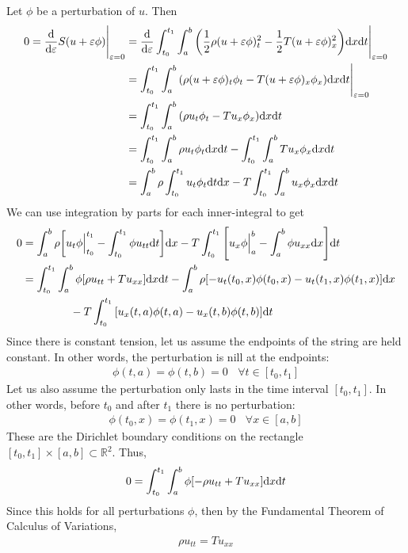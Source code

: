 \documentclass[12pt]{article}
\theoremstyle{plain}
\newcommand{\E}{\varepsilon}
\begin{document}
Let $\phi$ be a perturbation of $u$.  Then
\begin{align*}
    0 = \frac{\dd}{\dd \E}S(u + \E\phi)\Bigg|_{\E = 0} &= \frac{\dd}{\dd \E}\int_{t_0}^{t_1}\int_a^b \qty(\frac{1}{2}\rho (u + \E\phi)_t^2 - \frac{1}{2}T (u + \E\phi)_x^2)\dd x \dd t \Bigg|_{\E = 0} \\
    &= \int_{t_0}^{t_1} \int_a^b \qty(\rho(u + \E \phi)_t\phi_t - T(u + \E \phi)_x \phi_x) \dd x \dd t\Bigg|_{\E = 0} \\
    &= \int_{t_0}^{t_1}\int_a^b \qty(\rho u_t \phi_t - T u_x \phi_x) \dd x \dd t \\
    &= \int_{t_0}^{t_1}\int_a^b \rho u_t \phi_t \dd x \dd t - \int_{t_0}^{t_1} \int_a^b T u_x \phi_x \dd x \dd t \\
    &= \int_a^b \rho \int_{t_0}^{t_1} u_t \phi_t \dd t \dd x - T \int_{t_0}^{t_1}\int_a^b u_x \phi_x \dd x \dd t
\end{align*}
We can use integration by parts for each inner-integral to get
\begin{align*}
    0 &= \int_a^b \rho \qty[u_t\phi\Big|_{t_0}^{t_1} - \int_{t_0}^{t_1}\phi u_{tt} \dd t] \dd x - T\int_{t_0}^{t_1}\qty[u_x\phi\Big|_a^b - \int_a^b \phi u_{xx} \dd x]\dd t \\
    &= \int_{t_0}^{t_1}\int_a^b \phi\qty[\rho u_{tt} + T u_{xx}]\dd x \dd t - \int_a^b \rho \qty[-u_t(t_0, x)\phi(t_0, x) - u_t(t_1, x)\phi(t_1, x)]\dd x \\
    &\ \ \ \ \ \ \ \ \ \ \ \ \ - T\int_{t_0}^{t_1}\qty[u_x(t, a)\phi(t, a) - u_x(t, b)\phi(t, b)]\dd t
\end{align*}
Since there is constant tension, let us assume the endpoints of the string are held constant.  In other words, the perturbation is nill at the endpoints:
\begin{align*}
    \phi(t, a) = \phi(t, b) = 0\ \ \ \ \forall t \in [t_0, t_1]
\end{align*}
Let us also assume the perturbation only lasts in the time interval $[t_0, t_1]$.  In other words, before $t_0$ and after $t_1$ there is no perturbation:
\begin{align*}
    \phi(t_0, x) = \phi(t_1, x) = 0\ \ \ \ \forall x \in [a, b]
\end{align*}
These are the Dirichlet boundary conditions on the rectangle $[t_0, t_1] \times [a, b] \subset \mathbb{R}^2$.  Thus,
\begin{align*}
    0 = \int_{t_0}^{t_1} \int_a^b \phi\qty[-\rho u_{tt} + T u_{xx}] \dd x \dd t
\end{align*}
Since this holds for all perturbations $\phi$, then by the Fundamental Theorem of Calculus of Variations,
\begin{align*}
    \rho u_{tt} = T u_{xx}
\end{align*}
\end{document}
